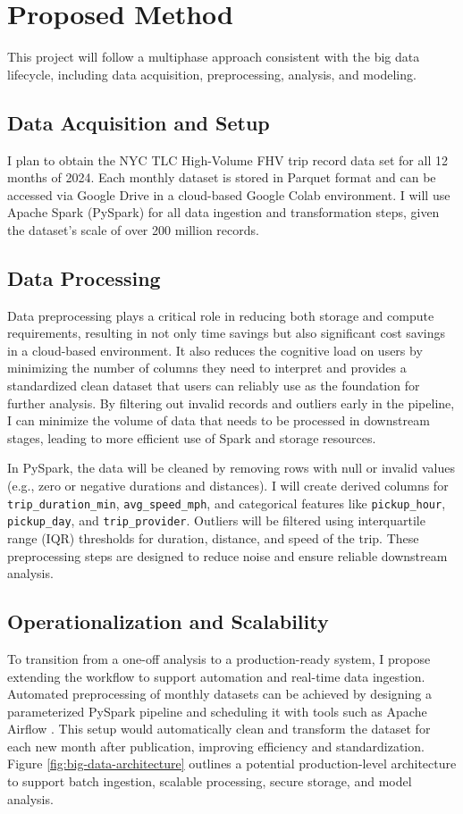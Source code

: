 \documentclass[12pt,letterpaper]{article}
\begin{document}
\section{Proposed Method}
This project will follow a multiphase approach consistent with the big data lifecycle, including data acquisition, preprocessing, analysis, and modeling.

\subsection{Data Acquisition and Setup}
I plan to obtain the NYC TLC High-Volume FHV trip record data set for all 12 months of 2024. Each monthly dataset is stored in Parquet format and can be accessed via Google Drive in a cloud-based Google Colab environment. I will use Apache Spark (PySpark) for all data ingestion and transformation steps, given the dataset's scale of over 200 million records.

\subsection{Data Processing}
Data preprocessing plays a critical role in reducing both storage and compute requirements, resulting in not only time savings but also significant cost savings in a cloud-based environment. It also reduces the cognitive load on users by minimizing the number of columns they need to interpret and provides a standardized clean dataset that users can reliably use as the foundation for further analysis. By filtering out invalid records and outliers early in the pipeline, I can minimize the volume of data that needs to be processed in downstream stages, leading to more efficient use of Spark and storage resources.

In PySpark, the data will be cleaned by removing rows with null or invalid values (e.g., zero or negative durations and distances). I will create derived columns for \texttt{trip\_duration\_min}, \texttt{avg\_speed\_mph}, and categorical features like \texttt{pickup\_hour}, \texttt{pickup\_day}, and \texttt{trip\_provider}. Outliers will be filtered using interquartile range (IQR) thresholds for duration, distance, and speed of the trip. These preprocessing steps are designed to reduce noise and ensure reliable downstream analysis. 

\subsection{Operationalization and Scalability}
To transition from a one-off analysis to a production-ready system, I propose extending the workflow to support automation and real-time data ingestion. Automated preprocessing of monthly datasets can be achieved by designing a parameterized PySpark pipeline and scheduling it with tools such as Apache Airflow \cite{airflow2024}. This setup would automatically clean and transform the dataset for each new month after publication, improving efficiency and standardization. Figure \ref{fig:big-data-architecture} outlines a potential production-level architecture to support batch ingestion, scalable processing, secure storage, and model analysis.
\end{document}
